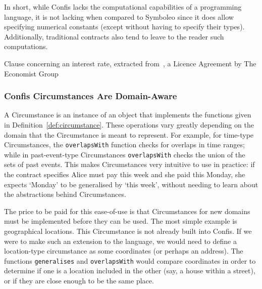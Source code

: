 In short, while Confis lacks the computational capabilities of a programming language, it is not lacking when compared to Symboleo since it does allow specifying numerical constants (except without having to specify their types).
Additionally, traditional contracts also tend to leave to the reader such computations.

\begin{table}[h]
    \centering
    \setlength{\fboxsep}{10pt}
    \caption[The Econoimist licence interest rate clause]{Clause concerning an interest rate, extracted from~\cite{economistIU2016licence}, a Licence Agreement by The Economist Group}
    \label{tab:economist-interest}
\end{table}

\subsubsection{Confis Circumstances Are Domain-Aware}
\label{subsubsec:limits-domain-circumstances}

A Circumstance is an instance of an object that implements the functions given in Definition~\autoref{def:circumstance}.
These operations vary greatly depending on the domain that the Circumstance is meant to represent.
For example, for time-type Circumstances, the \texttt{overlapsWith} function checks for overlaps in time ranges;
while in past-event-type Circumstances \texttt{overlapsWith} checks the union of the sets of past events.
This makes Circumstances very intuitive to use in practice: if the contract specifies Alice must pay this week and she paid this Monday, she expects `Monday' to be generalised by `this week', without needing to learn about the abstractions behind Circumstances.


The price to be paid for this ease-of-use is that Circumstances for new domains must be implemented before they can be used.
The most simple example is geographical locations.
This Circumstance is not already built into Confis.
If we were to make such an extension to the language, we would need to define a location-type circumstance as some coordinates (or perhaps an address).
The functions \texttt{generalises} and \texttt{overlapsWith} would compare coordinates in order to determine if one is a location included in the other (say, a house within a street), or if they are close enough to be the same place.

